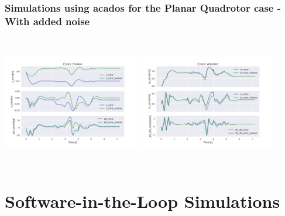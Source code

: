 \documentclass{thesisbeamer}
\newcommand\Fontvi{\fontsize{9}{10}\selectfont}
\begin{document}
\begin{frame}
	\frametitle{Simulations using acados for the Planar Quadrotor case - With added noise}
	\Fontvi
	
	\begin{columns}[t]
		\centering
			\includegraphics[width=6cm,height=5cm]{Images/acados_simulations/flip_trajectory/planar_quadrotor/noisy/Errors_position.png}
			\centering
			\includegraphics[width=6cm,height=5cm]{Images/acados_simulations/flip_trajectory/planar_quadrotor/noisy/Errors_velocities.png}
	\end{columns}
	
	
\end{frame}

\section{Software-in-the-Loop Simulations}
\end{document}
